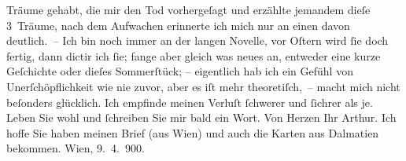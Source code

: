 \begin{ledgroupsized}[t]{13cm}
{                  Träume}{}\label{K_L01031_2h} gehabt, die
               mir den Tod vorhergeſagt und erzählte jemandem dieſe 3 Träume, nach dem Aufwachen
               erinnerte ich mich nur an einen davon deutlich. – Ich bin noch immer an der langen
                  Novelle, vor
                  Oſtern wird ſie doch fertig, dann dictir ich ſie; fange aber gleich
               was neues an, entweder eine kurze Geſchichte oder dieſes Sommerſtück; – eigentlich hab ich ein Gefühl von
                  Unerſchöpf{\pb}lichkeit wie nie zuvor, aber es iſt mehr
               theoretiſch, – macht mich nicht beſonders glücklich. Ich empfinde meinen Verluſt
               ſchwerer und ſichrer als je.\pend
           \pstart
           Leben Sie wohl und ſchreiben Sie mir bald ein Wort.\pend
           \pstart Von Herzen Ihr \spacefill\mbox{Arthur.}\pend{}\pstart
           \noindent{}Ich hoffe Sie haben meinen Brief \introOben{}(aus Wien)\introOben{} und auch die Karten aus Dalmatien bekommen.\pend
           \pstart
           Wien, 9. 4. 900.\pend
           \endnumbering{}\end{ledgroupsized}  \newcommand{\dateiname}{L01031}\newcommand{\titel}{Arthur Schnitzler an Hugo von Hofmannsthal, 9. 4. 1900}\newcommand{\editorInnen}{Martin Anton Müller und Gerd-Hermann Susen}
            \footnotesize
\begin{ledgroupsized}[t]{11.5cm}
\end{ledgroupsized}
         
      
